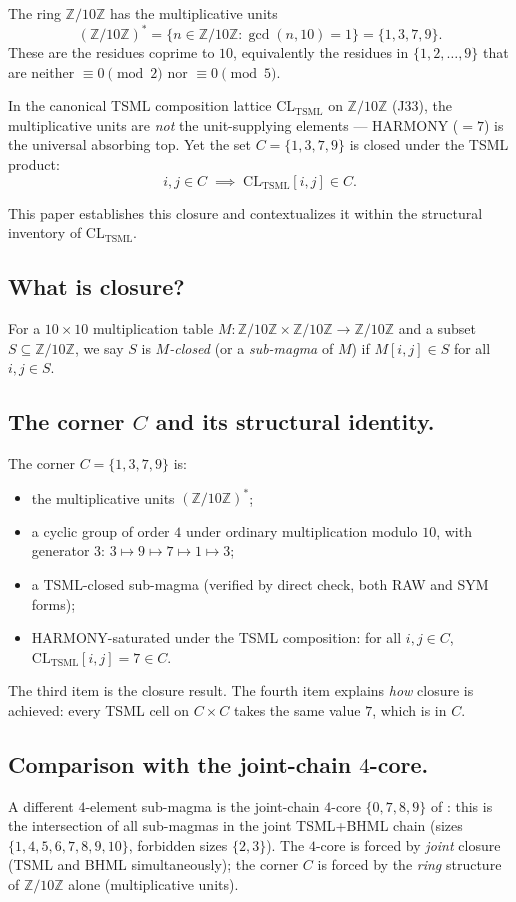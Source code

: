 \documentclass[11pt,reqno]{amsart}
\theoremstyle{plain}
\theoremstyle{definition}
\theoremstyle{remark}
\newcommand{\Z}{\mathbb{Z}}
\newcommand{\TSML}{\mathrm{TSML}}
\begin{document}
The ring $\Z/10\Z$ has the multiplicative units
\[
(\Z/10\Z)^* = \{n \in \Z/10\Z : \gcd(n, 10) = 1\}
= \{1, 3, 7, 9\}.
\]
These are the residues coprime to $10$, equivalently the residues
in $\{1, 2, \ldots, 9\}$ that are neither $\equiv 0 \pmod 2$ nor
$\equiv 0 \pmod 5$.

In the canonical TSML composition lattice $\mathrm{CL}_\TSML$ on
$\Z/10\Z$ \cite{SandersForcing} (J33), the multiplicative units are
\emph{not} the unit-supplying elements --- HARMONY ($= 7$) is the
universal absorbing top. Yet the set $C = \{1, 3, 7, 9\}$ is
closed under the TSML product:
\[
i, j \in C \;\implies\; \mathrm{CL}_\TSML[i, j] \in C.
\]

This paper establishes this closure and contextualizes it within
the structural inventory of $\mathrm{CL}_\TSML$.

\subsection{What is closure?}
For a $10 \times 10$ multiplication table $M : \Z/10\Z \times
\Z/10\Z \to \Z/10\Z$ and a subset $S \subseteq \Z/10\Z$, we say
$S$ is \emph{$M$-closed} (or a \emph{sub-magma} of $M$) if
$M[i, j] \in S$ for all $i, j \in S$.

\subsection{The corner $C$ and its structural identity.}
The corner $C = \{1, 3, 7, 9\}$ is:
\begin{itemize}
\item the multiplicative units $(\Z/10\Z)^*$;
\item a cyclic group of order $4$ under ordinary multiplication
modulo $10$, with generator $3$:
$3 \mapsto 9 \mapsto 7 \mapsto 1 \mapsto 3$;
\item a TSML-closed sub-magma (verified by direct check, both RAW
and SYM forms);
\item HARMONY-saturated under the TSML composition: for all
$i, j \in C$, $\mathrm{CL}_\TSML[i, j] = 7 \in C$.
\end{itemize}
The third item is the closure result. The fourth item explains
\emph{how} closure is achieved: every TSML cell on $C \times C$
takes the same value $7$, which is in $C$.

\subsection{Comparison with the joint-chain $4$-core.}
A different $4$-element sub-magma is the joint-chain $4$-core
$\{0, 7, 8, 9\}$ of \cite{SandersGishFourCore}: this is the
intersection of all sub-magmas in the joint TSML+BHML chain
(sizes $\{1, 4, 5, 6, 7, 8, 9, 10\}$, forbidden sizes $\{2, 3\}$).
The $4$-core is forced by \emph{joint} closure (TSML and BHML
simultaneously); the corner $C$ is forced by the \emph{ring} structure
of $\Z/10\Z$ alone (multiplicative units).
\end{document}
